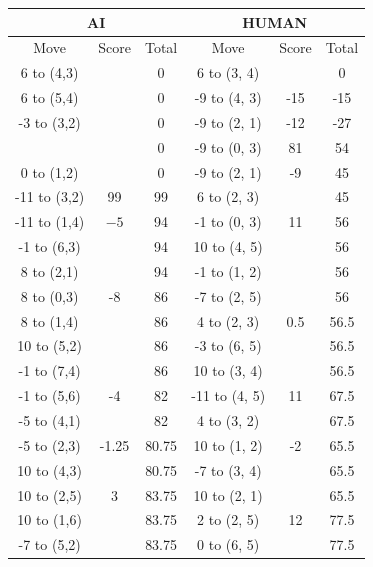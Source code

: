 \begin{appendices}
\begingroup
\renewcommand\arraystretch{0.75}
\begin{longtable}[H]{cccccc}
    \hline
    \multicolumn{3}{c}{AI}       & \multicolumn{3}{c}{HUMAN}     \\ \hline
    Move         & Score & Total & Move          & Score & Total \\ \hline
      6 to (4,3) &      &  0    &   6 to (3, 4) &      &  0    \\ \hline
      6 to (5,4) &      &  0    &  -9 to (4, 3) & -15   & -15   \\ \hline
     -3 to (3,2) &      &  0    &  -9 to (2, 1) & -12   & -27   \\ \hline
                 &      &  0    &  -9 to (0, 3) &  81   &  54   \\ \hline
      0 to (1,2) &      &  0    &  -9 to (2, 1) &  -9    & 45    \\ \hline
    -11 to (3,2) &  99   &  99   &   6 to (2, 3) &      &  45    \\ \hline
    -11 to (1,4) &  $-5$  &  94  &  -1 to (0, 3) &  11   &  56    \\ \hline
     -1 to (6,3) &      &  94  &  10 to (4, 5) &      &  56    \\ \hline
      8 to (2,1) &      &  94  &  -1 to (1, 2) &      &  56    \\ \hline
      8 to (0,3) &  -8   &  86   &  -7 to (2, 5) &      &  56    \\ \hline
      8 to (1,4) &      &  86   &   4 to (2, 3) &  0.5  &  56.5  \\ \hline
     10 to (5,2) &      &  86   &  -3 to (6, 5) &      &  56.5  \\ \hline
     -1 to (7,4) &      &  86   &  10 to (3, 4) &      &  56.5   \\ \hline
     -1 to (5,6) &  -4   &  82   & -11 to (4, 5) &  11   &  67.5    \\ \hline
     -5 to (4,1) &      &  82   &   4 to (3, 2) &      &  67.5    \\ \hline
     -5 to (2,3) &  -1.25  &  80.75    &  10 to (1, 2) &  -2    &  65.5    \\ \hline
     10 to (4,3) &      &  80.75    &  -7 to (3, 4) &      &  65.5    \\ \hline
     10 to (2,5) &  3    &  83.75    &  10 to (2, 1) &      &  65.5    \\ \hline
     10 to (1,6) &      &  83.75    &   2 to (2, 5) &  12    &  77.5    \\ \hline
     -7 to (5,2) &      &  83.75    &   0 to (6, 5) &      &  77.5    \\ \hline

\end{longtable}
\end{appendices}
